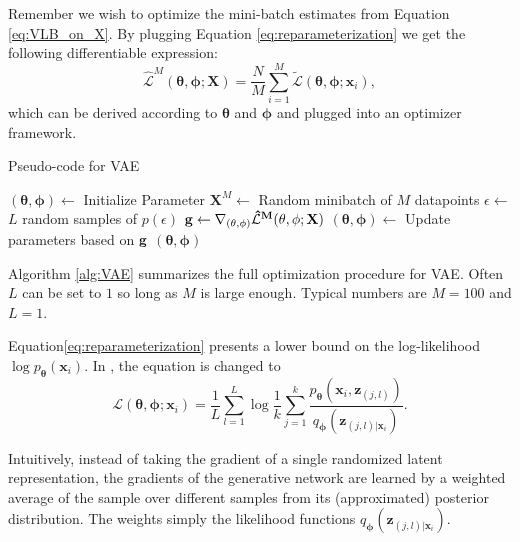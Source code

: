 \documentclass[graybox]{svmult}
\newcommand{\mb}[1]{\mathbf{#1}}
\newcommand{\bx}[0]{\mb{x}}
\newcommand{\bX}[0]{\mb{X}}
\newcommand{\bz}[0]{\mb{z}}
\newcommand{\btheta}[0]{\mb{\theta}}
\newcommand{\bphi}[0]{\mb{\phi}}
\newcommand{\Ex}[2]{\mathbb{E}_{{#1}}\Big[ {#2} \Big]}
\newcommand{\mathL}[0]{\mathcal{L}}
\newcommand{\tmathL}[0]{\tilde{\mathcal{L}}}
\begin{document}

Remember we wish to optimize the mini-batch estimates from Equation \ref{eq:VLB_on_X}. By plugging Equation \ref{eq:reparameterization} we get the following differentiable expression: 
\begin{equation}
    \label{eq:hatMathLDefined}
    \hat{\mathL}^{M} (\btheta,\bphi ; \bX) = \frac{N}{M}\sum_{i=1}^M\tmathL(\btheta,\bphi ; \bx_i),
\end{equation}
which can be derived according to $\btheta$ and $\bphi$ and plugged into an optimizer framework. 

\begin{algorithm}
\caption{Pseudo-code for VAE}
\begin{algorithmic}
\STATE $ (\btheta, \bphi) \gets$ Initialize Parameter
\REPEAT
\STATE $\bX^M \gets$ Random minibatch of $M$ datapoints
\STATE $\epsilon \gets$ $L$ random samples of $p(\epsilon)$ 
\STATE $\bf{g} \gets \nabla_{(\btheta, \bphi)}\hat{\mathL}^{M} (\btheta,\bphi ; \bX)$
\STATE $ (\btheta, \bphi) \gets$ Update parameters based on $\bf{g}$
\UNTIL{Convergenge of $ (\btheta, \bphi)$}
\RETURN $ (\btheta, \bphi)$
\end{algorithmic}
\label{alg:VAE}
\end{algorithm}

Algorithm \ref{alg:VAE} summarizes the full optimization procedure for VAE. Often $L$ can be set to $1$ so long as $M$ is large enough. Typical numbers are $M=100$ and $L=1$.



Equation\ref{eq:reparameterization} presents a lower bound on the log-likelihood $\log{p_\btheta(\bx_i)}$. In \cite{IWAE}, the equation is changed to 
\begin{equation}
\label{eq:IWAE}
    \mathL(\btheta,\bphi ; \bx_i) =
    \frac{1}{L} \sum_{l=1}^L  \log{\frac{1}{k} \sum_{j=1}^k\frac{p_\btheta(\bx_i,\bz_{(j,l)})}{q_{\bphi}(\bz_{(j,l)|\bx_i})}}.
\end{equation}

Intuitively, instead of taking the gradient of a single randomized latent representation, the gradients of the generative network are learned by a weighted average of the sample over different samples from its (approximated) posterior distribution. The weights simply the likelihood functions $q_{\bphi}(\bz_{(j,l)|\bx_i})$.
\end{document}
